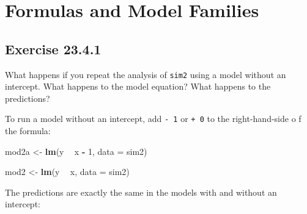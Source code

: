 \documentclass[]{book}
\newenvironment{Shaded}{\begin{snugshade}}{\end{snugshade}}
\newcommand{\CommentTok}[1]{\textcolor[rgb]{0.56,0.35,0.01}{\textit{#1}}}
\newcommand{\DataTypeTok}[1]{\textcolor[rgb]{0.13,0.29,0.53}{#1}}
\newcommand{\DecValTok}[1]{\textcolor[rgb]{0.00,0.00,0.81}{#1}}
\newcommand{\KeywordTok}[1]{\textcolor[rgb]{0.13,0.29,0.53}{\textbf{#1}}}
\newcommand{\NormalTok}[1]{#1}
\newcommand{\OperatorTok}[1]{\textcolor[rgb]{0.81,0.36,0.00}{\textbf{#1}}}
\newcommand{\StringTok}[1]{\textcolor[rgb]{0.31,0.60,0.02}{#1}}
\theoremstyle{plain}
\theoremstyle{remark}
\begin{document}
\hypertarget{formulas-and-model-families}{%
\section{Formulas and Model
Families}\label{formulas-and-model-families}}

\hypertarget{exercise-23.4.1}{%
\subsection*{\texorpdfstring{Exercise
{23.4.1}}{Exercise 23.4.1}}\label{exercise-23.4.1}}

What happens if you repeat the analysis of \texttt{sim2} using a model
without an intercept. What happens to the model equation? What happens
to the predictions?

To run a model without an intercept, add \texttt{-\ 1} or \texttt{+\ 0}
to the right-hand-side o f the formula:

\begin{Shaded}
\begin{Highlighting}[]
\NormalTok{mod2a <-}\StringTok{ }\KeywordTok{lm}\NormalTok{(y }\OperatorTok{~}\StringTok{ }\NormalTok{x }\OperatorTok{-}\StringTok{ }\DecValTok{1}\NormalTok{, }\DataTypeTok{data =}\NormalTok{ sim2)}
\end{Highlighting}
\end{Shaded}

\begin{Shaded}
\begin{Highlighting}[]
\NormalTok{mod2 <-}\StringTok{ }\KeywordTok{lm}\NormalTok{(y }\OperatorTok{~}\StringTok{ }\NormalTok{x, }\DataTypeTok{data =}\NormalTok{ sim2)}
\end{Highlighting}
\end{Shaded}

The predictions are exactly the same in the models with and without an
intercept:

\begin{Shaded}
\end{Shaded}
\end{document}

